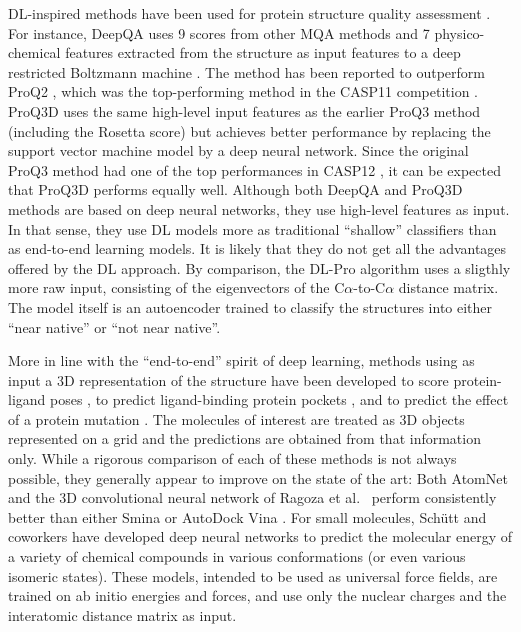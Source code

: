 DL-inspired methods have been used for protein structure quality
assessment \cite{nguyen2014dlpro, cao2016deepqa,
uziela2017proq3d}. For instance, DeepQA \cite{cao2016deepqa} uses 9
scores from other MQA methods and 7 physico-chemical features
extracted from the structure as input features to a deep restricted
Boltzmann machine \cite{hinton2006fast}. The method has been
reported \cite{cao2016deepqa} to outperform ProQ2 \cite{ray2012proq2},
which was the top-performing method in the CASP11
competition \cite{kryshtafovych2015}.  ProQ3D \cite{uziela2017proq3d}
uses the same high-level input features as the earlier ProQ3
method \cite{uziela2016proq3} (including the
Rosetta \cite{leaverfay2011rosetta} score) but achieves better
performance by replacing the support vector machine model by a deep
neural network. Since the original ProQ3 method had one of the top
performances in CASP12 \cite{elofsson2017qacasp12}, it can be expected
that ProQ3D performs equally well. Although both DeepQA and ProQ3D
methods are based on deep neural networks, they use high-level
features as input. In that sense, they use DL models more as
traditional ``shallow'' classifiers than as end-to-end learning
models. It is likely that they do not get all the advantages offered
by the DL approach.
%
By comparison, the DL-Pro algorithm \cite{nguyen2014dlpro} uses a
sligthly more raw input, consisting of the eigenvectors of the
C$\alpha$-to-C$\alpha$ distance matrix. The model itself is an
autoencoder \cite{hinton2006reducing} trained to classify the
structures into either ``near native'' or ``not near native''.

More in line with the ``end-to-end'' spirit of deep learning, methods
using as input a 3D representation of the structure have been
developed to score protein-ligand poses \cite{wallach2015atomnet,
ragoza2017protein}, to predict ligand-binding protein
pockets \cite{jimenez2017deepsite}, and to predict the effect of a
protein mutation \cite{torng2017}. The molecules of interest are
treated as 3D objects represented on a grid and the predictions are
obtained from that information only. While a rigorous comparison of
each of these methods is not always possible, they generally appear to
improve on the state of the art: Both
AtomNet \cite{wallach2015atomnet} and the 3D convolutional neural
network of Ragoza et al.\ \cite{ragoza2017protein} perform
consistently better than either Smina \cite{koes2013smina} or AutoDock
Vina \cite{trott2009vina}.
%
For small molecules, Sch\"{u}tt and coworkers \cite{schutt2017quantum,
schutt2017moleculenet} have developed deep neural networks to predict
the molecular energy of a variety of chemical compounds in various
conformations (or even various isomeric states). These models,
intended to be used as universal force fields, are trained on ab
initio energies and forces, and use only the nuclear charges and the
interatomic distance matrix as input.
